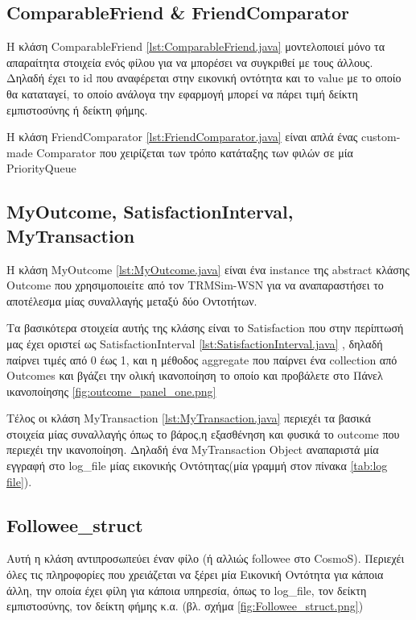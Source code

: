 \subsection{ComparableFriend \& FriendComparator}
 Η κλάση ComparableFriend \ref{lst:ComparableFriend.java} μοντελοποιεί μόνο τα απαραίτητα στοιχεία ενός φίλου για να μπορέσει να συγκριθεί με τους άλλους. Δηλαδή έχει το id που αναφέρεται στην εικονική οντότητα και το value με το οποίο θα καταταγεί, το οποίο ανάλογα την εφαρμογή μπορεί να πάρει τιμή δείκτη εμπιστοσύνης ή δείκτη φήμης.

 
Η κλάση FriendComparator \ref{lst:FriendComparator.java} είναι απλά ένας custom-made Comparator που χειρίζεται των τρόπο κατάταξης των φιλών σε μία PriorityQueue
 
 
\newpage


\subsection{MyOutcome, SatisfactionInterval, MyTransaction}

Η κλάση MyOutcome \ref{lst:MyOutcome.java} είναι ένα instance της abstract κλάσης Outcome που χρησιμοποιείτε από τον TRMSim-WSN για να αναπαραστήσει το αποτέλεσμα μίας συναλλαγής μεταξύ δύο Οντοτήτων.
 
 
  Τα βασικότερα στοιχεία αυτής της κλάσης είναι το Satisfaction που στην περίπτωσή μας έχει οριστεί ως SatisfactionInterval  \ref{lst:SatisfactionInterval.java} , δηλαδή παίρνει τιμές από 0 έως 1, και η μέθοδος aggregate  που παίρνει ένα collection από Outcomes και βγάζει την ολική ικανοποίηση το οποίο και προβάλετε στο Πάνελ ικανοποίησης \ref{fig:outcome_panel_one.png}

Τέλος οι κλάση MyTransaction \ref{lst:MyTransaction.java} περιεχέι τα βασικά στοιχεία μίας συναλλαγής όπως το βάρος,η εξασθένηση και φυσικά το outcome που περιεχέι την ικανοποίηση. Δηλαδή ένα MyTransaction Object αναπαριστά μία εγγραφή στο log\_file μίας εικονικής Οντότητας(μία γραμμή στον πίνακα \ref{tab:log file}).


\subsection{Followee\_struct}
Αυτή η κλάση αντιπροσωπεύει έναν φίλο (ή αλλιώς followee στο CosmoS). Περιεχέι όλες τις πληροφορίες που χρειάζεται να ξέρει μία Εικονική Οντότητα για κάποια άλλη, την οποία έχει φίλη για κάποια υπηρεσία, όπως το log\_file, τον δείκτη εμπιστοσύνης, τον δείκτη φήμης κ.α. (βλ. σχήμα \ref{fig:Followee_struct.png})

